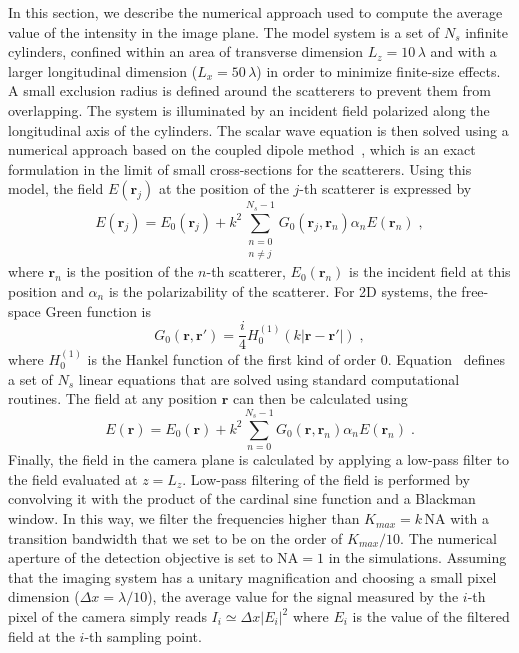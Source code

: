 \documentclass[aps,prl,twocolumn,amsmath,amssymb,superscriptaddress,10pt,nobibnotes]{revtex4-2}
\makeatletter
\renewcommand{\eqref}[1]{\textup{\tagform@{\ref*{#1}}}}
\renewcommand{\bm}[1]{\boldsymbol{\mathbf{#1}}}
\newcommand{\Eq}[1]{Equation~\eqref{#1}}
\makeatother
\begin{document}
In this section, we describe the numerical approach used to compute the average value of the intensity in the image plane. The model system is a set of $N_s$ infinite cylinders, confined within an area of transverse dimension $L_z=10 \, \lambda$ and with a larger longitudinal dimension ($L_x=50 \, \lambda$) in order to minimize finite-size effects. A small exclusion radius is defined around the scatterers to prevent them from overlapping. The system is illuminated by an incident field polarized along the longitudinal axis of the cylinders. The scalar wave equation is then solved using a numerical approach based on the coupled dipole method~\cite{lax_multiple_1952_2}, which is an exact formulation in the limit of small cross-sections for the scatterers. Using this model, the field $E(\bm{r}_j)$ at the position of the $j$-th scatterer is expressed by
\begin{equation}
E(\bm{r}_j)=E_0(\bm{r}_j) + k^2 \sum_{\substack{n=0 \\ n \neq j}}^{N_s-1} G_0(\bm{r}_j,\bm{r}_n) \alpha_n E(\bm{r}_n) \; ,
\label{eq_coupled_dipoles}
\end{equation}
where $\bm{r}_n$ is the position of the $n$-th scatterer, $E_0(\bm{r}_n)$ is the incident field at this position and $\alpha_n$ is the polarizability of the scatterer. For 2D systems, the free-space Green function is
\begin{equation}
G_0(\bm{r},\bm{r}') = \frac{i}{4} H_0^{(1)} (k |\bm{r}-\bm{r}'|) \; ,
\end{equation}
where $H_0^{(1)}$ is the Hankel function of the first kind of order 0. \Eq{eq_coupled_dipoles} defines a set of $N_s$ linear equations that are solved using standard computational routines. The field at any position $\bm{r}$ can then be calculated using
\begin{equation}
E(\bm{r})=E_0(\bm{r}) + k^2 \sum_{n=0}^{N_s-1} G_0(\bm{r},\bm{r}_n) \alpha_n E(\bm{r}_n) \; .
\label{eq_coupled_dipoles2}
\end{equation}
Finally, the field in the camera plane is calculated by applying a low-pass filter to the field evaluated at $z=L_z$. Low-pass filtering of the field is performed by convolving it with the product of the cardinal sine function and a Blackman window. In this way, we filter the frequencies higher than $ K_{max}= k \, \mathrm{NA}$ with a transition bandwidth that we set to be on the order of $K_{max}/10$. The numerical aperture of the detection objective is set to $\mathrm{NA}=1$ in the simulations. Assuming that the imaging system has a unitary magnification and choosing a small pixel dimension ($\Delta x=\lambda/10$), the average value for the signal measured by the $i$-th pixel of the camera simply reads $I_i \simeq \Delta x |E_i|^2 $ where $E_i$ is the value of the filtered field at the $i$-th sampling point. 
\end{document}
